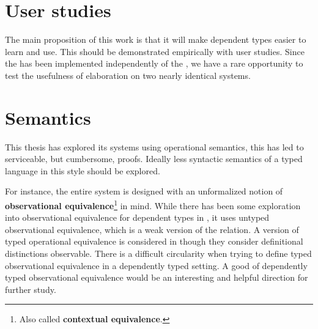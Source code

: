 \section{User studies}
 
The main proposition of this work is that it will make dependent types easier to learn and use.
This should be demonstrated empirically with user studies.
Since the \slang{} has been implemented independently of the \clang{}, we have a rare opportunity to test the usefulness of elaboration on two nearly identical systems.
 
\section{Semantics}
 
This thesis has explored its systems using operational semantics, this has led to serviceable, but cumbersome, proofs.
Ideally less syntactic semantics of a typed language in this style should be explored.
 
For instance, the entire system is designed with an unformalized notion of \textbf{observational equivalence}\footnote{Also called \textbf{contextual equivalence}.} in mind.
While there has been some exploration into observational equivalence for dependent types in \cite{sjoberg2015dependently,jia2010dependent}, it uses untyped observational equivalence, which is a weak version of the relation.
A version of typed operational equivalence is considered in \cite{VAKAR2018401} though they consider definitional distinctions observable. %
There is a difficult circularity when trying to define typed observational equivalence in a dependently typed setting.
A good of dependently typed observational equivalence would be an interesting and helpful direction for further study.


